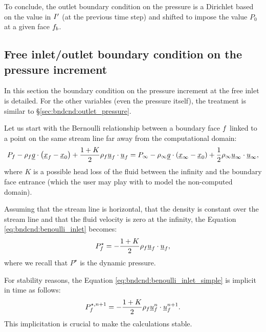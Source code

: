 To conclude, the outlet boundary condition on the pressure is a Dirichlet based on
the value in ${I^\prime}$ (at the previous time step) and shifted to impose
the value $P_0$ at a given face ${f_{b}}$.

\subsection{Free inlet/outlet boundary condition on the pressure increment}\label{sec:bndcnd:inlet_bernoulli_pressure}

In this section the boundary condition on the pressure increment at the free inlet is detailed.
For the other variables (even the pressure itself), the treatment is similar to \S \ref{sec:bndcnd:outlet_pressure}.

Let us start with the Bernoulli relationship between a boundary face ${f}$ linked to a point on the same
stream line far away from the computational domain:
\begin{equation}\label{eq:bndcnd:benoulli_inlet}
P_{f} - \rho_{f} \underline{g} \cdot  \left( \underline{x}_{f} - \underline{x}_0 \right) + \dfrac{1+K}{2}\rho_{f} \underline{u}_{f} \cdot \underline{u}_{f}  = P_\infty - \rho_\infty \underline{g} \cdot \left(  \underline{x}_\infty
- \underline{x}_0 \right)
+ \dfrac{1}{2}\rho_\infty \underline{u}_\infty \cdot \underline{u}_\infty,
\end{equation}
where $K$ is a possible head loss of the fluid between the infinity and the boundary face entrance
(which the user may play with to model the non-computed domain).

Assuming that the stream line is horizontal, that the density is constant over the stream line and that the fluid velocity is zero
at the infinity, the Equation \eqref{eq:bndcnd:benoulli_inlet} becomes:
\begin{equation}\label{eq:bndcnd:benoulli_inlet_simple}
P_{f}^\star =- \dfrac{1+K}{2} \rho_{f} \underline{u}_{f} \cdot \underline{u}_{f} ,
\end{equation}
where we recall that $P^\star$ is the dynamic pressure.

For stability reasons, the Equation \eqref{eq:bndcnd:benoulli_inlet_simple} is implicit in time as follows:
\begin{equation}\label{eq:bndcnd:benoulli_inlet_time}
P_{f}^{\star, n+1} =- \dfrac{1+K}{2} \rho_{f} \underline{u}^{n}_{f} \cdot \underline{u}^{n+1}_{f}.
\end{equation}
This implicitation is crucial to make the calculations stable.

